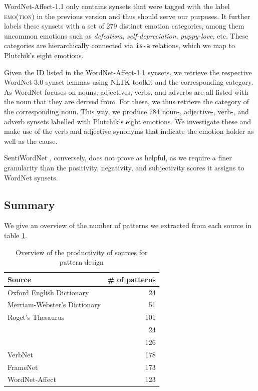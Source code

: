 WordNet-Affect-1.1 only contains synsets that were tagged with the label \textsc{emo(tion)} in the previous version and thus should serve our purposes. It further labels these synsets with a set of 279 distinct emotion categories, among them uncommon emotions such as \textit{defeatism}, \textit{self-depreciation}, \textit{puppy-love}, etc. These categories are hierarchically connected via \texttt{is-a} relations, which we map to Plutchik's eight emotions.

Given the ID listed in the WordNet-Affect-1.1 synsets, we retrieve the respective WordNet-3.0 synset lemmas using NLTK toolkit \cite{nltk} and the corresponding category. As WordNet focuses on nouns, adjectives, verbs, and adverbs are all listed with the noun that they are derived from. For these, we thus retrieve the category of the corresponding noun. This way, we produce 784 noun-, adjective-, verb-, and adverb synsets labelled with Plutchik's eight emotions. We investigate these and make use of the verb and adjective synonyms that indicate the emotion holder as well as the cause.

SentiWordNet \cite{sentiwordnet}, conversely, does not prove as helpful, as we require a finer granularity than the positivity, negativity, and subjectivity scores it assigns to WordNet synsets.

\subsection{Summary}

We give an overview of the number of patterns we extracted from each source in table \ref{tab:patterns-from-sources}.

\begin{table}[]
\centering
\begin{tabular}{l|r}
{\bf Source}                 & {\bf \# of patterns} \\\hline
Oxford English Dictionary    & 24                   \\
Merriam-Webster's Dictionary & 51                   \\
Roget's Thesaurus            & 101                  \\
\citeauthor{emotion_verbs}   & 24                   \\
\citeauthor{adjective_supersenses} & 126                  \\
VerbNet                      & 178                  \\
FrameNet                     & 173                  \\
WordNet-Affect               & 123                 
\end{tabular}
\caption{Overview of the productivity of sources for pattern design}
\label{tab:patterns-from-sources}
\end{table}

